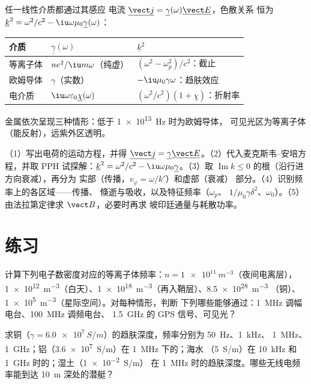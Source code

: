 \begin{remark}\label{rem:b2:waves-in-media:summary}
任一线性介质都通过其感应
电流 $\underline{\vect j} = \underline\gamma(\omega)\underline{\vect E}$，色散关系
恒为 $\underline k^2 = \omega^2/c^2 - \iu\omega\mu_0\underline\gamma(\omega)$：
\begin{center}\small
\begin{tabular}{lll}
介质 & $\underline\gamma(\omega)$ & $\underline k^2$\\ \hline
等离子体 & $ne^2/\iu m\omega$（纯虚）& $(\omega^2 - \omega_p^2)/c^2$：截止 \\
欧姆导体 & $\gamma$（实数）& $-\iu\mu_0\gamma\omega$：趋肤效应 \\
电介质 & $\iu\omega\varepsilon_0\underline\chi(\omega)$ & $(\omega^2/c^2)(1 + \underline\chi)$：折射率
\end{tabular}
\end{center}
金属依次呈现三种情形：低于 \qty{1e13}{Hz} 时为欧姆导体，
可见光区为等离子体（能反射），远紫外区透明。
\end{remark}

\begin{method}[介质中的波]\label{met:b2:waves-in-media:method}
（1）写出电荷的运动方程，并得 $\underline{\vect j} =
\underline\gamma\underline{\vect E}$。（2）代入麦克斯韦–安培方程，并取 PPH
试探解：$\underline k^2 = \omega^2/c^2 - \iu\omega\mu_0\underline\gamma$。（3）取
$\operatorname{Im}k \le 0$ 的根（沿行进方向衰减），再分为
实部（传播，$v_\varphi = \omega/k'$）和虚部（衰减）
部分。（4）识别频率上的各区域——传播、
倏逝与吸收，以及特征频率（$\omega_p$、
$1/\mu_0\gamma\delta^2$、$\omega_0$）。（5）由法拉第定律求 $\vect B$，必要时再求
坡印廷通量与耗散功率。
\end{method}

\section{练习}

\begin{exercise}[$\star$]\label{exo:b2:waves-in-media:1}
计算下列电子数密度对应的等离子体频率：$n = \qty{1e11}{m^{-3}}$（夜间电离层），
\qty{1e12}{m^{-3}}（白天）、\qty{1e18}{m^{-3}}（再入鞘层）、\qty{8.5e28}{m^{-3}}
（铜）、\qty{1e5}{m^{-3}}（星际空间）。对每种情形，判断
下列哪些能够通过：\qty{1}{MHz} 调幅电台、\qty{100}{MHz} 调频电台、
\qty{1.5}{GHz} 的 GPS 信号、可见光？
\end{exercise}

\begin{exercise}[$\star$]\label{exo:b2:waves-in-media:2}
求铜（$\gamma = \qty{6.0e7}{S/m}$）的趋肤深度，频率分别为 \qty{50}{Hz}、\qty{1}{kHz}、
\qty{1}{MHz}、\qty{1}{GHz}；铝（\qty{3.6e7}{S/m}）在 \qty{1}{MHz} 下的；海水
（\qty{5}{S/m}）在 \qty{10}{kHz} 和 \qty{1}{GHz} 时的；湿土（\qty{1e-2}{S/m}）
在 \qty{1}{MHz} 时的趋肤深度。哪些无线电频率能到达 \qty{10}{m} 深处的潜艇？
\end{exercise}

